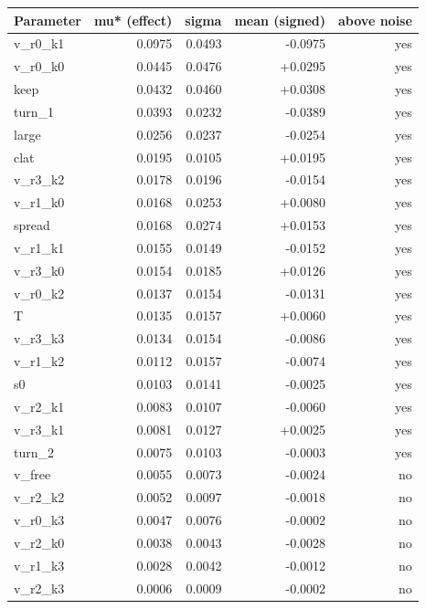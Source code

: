 \begin{tabular}{|l|r|r|r|r|}
\hline
\textbf{Parameter} & \textbf{mu* (effect)} & \textbf{sigma} & \textbf{mean (signed)} & \textbf{above noise} \\
\hline
v\_r0\_k1 & 0.0975 & 0.0493 & -0.0975 & yes \\
v\_r0\_k0 & 0.0445 & 0.0476 & +0.0295 & yes \\
keep & 0.0432 & 0.0460 & +0.0308 & yes \\
turn\_1 & 0.0393 & 0.0232 & -0.0389 & yes \\
large & 0.0256 & 0.0237 & -0.0254 & yes \\
clat & 0.0195 & 0.0105 & +0.0195 & yes \\
v\_r3\_k2 & 0.0178 & 0.0196 & -0.0154 & yes \\
v\_r1\_k0 & 0.0168 & 0.0253 & +0.0080 & yes \\
spread & 0.0168 & 0.0274 & +0.0153 & yes \\
v\_r1\_k1 & 0.0155 & 0.0149 & -0.0152 & yes \\
v\_r3\_k0 & 0.0154 & 0.0185 & +0.0126 & yes \\
v\_r0\_k2 & 0.0137 & 0.0154 & -0.0131 & yes \\
T & 0.0135 & 0.0157 & +0.0060 & yes \\
v\_r3\_k3 & 0.0134 & 0.0154 & -0.0086 & yes \\
v\_r1\_k2 & 0.0112 & 0.0157 & -0.0074 & yes \\
s0 & 0.0103 & 0.0141 & -0.0025 & yes \\
v\_r2\_k1 & 0.0083 & 0.0107 & -0.0060 & yes \\
v\_r3\_k1 & 0.0081 & 0.0127 & +0.0025 & yes \\
turn\_2 & 0.0075 & 0.0103 & -0.0003 & yes \\
v\_free & 0.0055 & 0.0073 & -0.0024 & no \\
v\_r2\_k2 & 0.0052 & 0.0097 & -0.0018 & no \\
v\_r0\_k3 & 0.0047 & 0.0076 & -0.0002 & no \\
v\_r2\_k0 & 0.0038 & 0.0043 & -0.0028 & no \\
v\_r1\_k3 & 0.0028 & 0.0042 & -0.0012 & no \\
v\_r2\_k3 & 0.0006 & 0.0009 & -0.0002 & no \\
\hline
\end{tabular}
